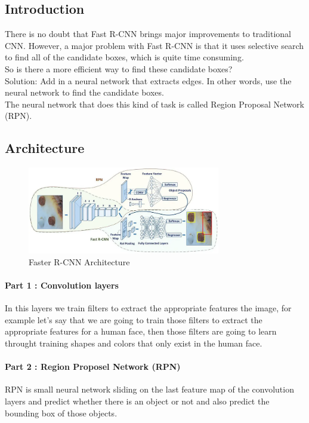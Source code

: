 \documentclass[12pt]{article}
\begin{document}
\subsection{Introduction}
There is no doubt that Fast R-CNN brings major improvements to traditional CNN. However, a major problem with Fast R-CNN is that it uses selective search to find all of the candidate boxes, which is quite time consuming.
\\
So is there a more efficient way to find these candidate boxes?
\\
Solution: Add in a neural network that extracts edges. In other words, use the neural network to find the candidate boxes.
\\
The neural network that does this kind of task is called Region Proposal Network (RPN).
\subsection{Architecture}
\begin{figure}[h]
    \centering
    \includegraphics[width=0.75\textwidth]{images/rcnn_arch.png}
    \caption{Faster R-CNN Architecture}
    \label{fig:rcnn1}
\end{figure}
\paragraph{Part 1 : Convolution layers}
In this layers we train filters to extract the appropriate features the image, for example let’s say that we are going to train those filters to extract the appropriate features for a human face, then those filters are going to learn throught training shapes and colors that only exist in the human face.

\paragraph{Part 2 : Region Proposel Network (RPN)}

RPN is small neural network sliding on the last feature map of the convolution layers and predict whether there is an object or not and also predict the bounding box of those objects.
\end{document}
